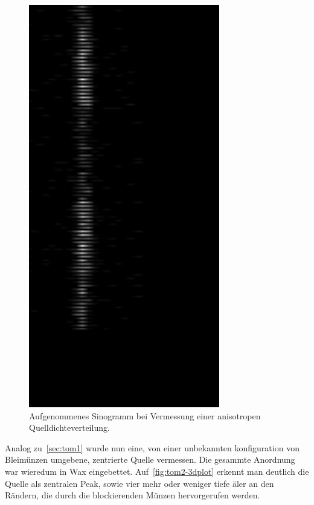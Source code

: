 \documentclass[slug=PET, room=Andreas-Schubert-Bau\,\ 424A, supervisor=Carsten\ Bittrich, coursedate=10.\ 01.\ 2020]{../../Lab_Report_LaTeX/lab_report}
\begin{document}
\begin{figure}[hb]
  \centering \includegraphics[width=.3\textwidth,
  angle=90]{../messungen/Tom2/tom2_Sinogramm.PNG}
  \caption{Aufgenommenes Sinogramm bei Vermessung einer anisotropen
    Quelldichteverteilung.}
  \label{fig:tom2}
\end{figure}

Analog zu~\ref{sec:tom1} wurde nun eine, von einer unbekannten
konfiguration von Bleim\"unzen umgebene, zentrierte Quelle
vermessen. Die gesammte Anordnung war wieredum in Wax eingebettet.
Auf~\ref{fig:tom2-3dplot} erkennt man deutlich die Quelle als
zentralen Peak, sowie vier mehr oder weniger tiefe \"aler an den
R\"andern, die durch die blockierenden M\"unzen hervorgerufen werden.
\end{document}
